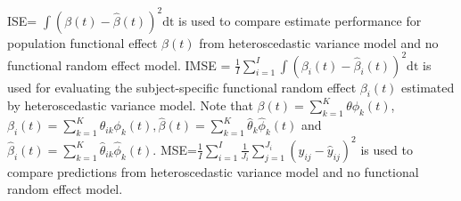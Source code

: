 ISE= $\int(\beta(t)-\hat{\beta}(t))^2 \mbox{dt}$ is used to compare estimate performance for population functional effect $\beta(t)$ from heteroscedastic variance model and no functional random effect model. IMSE = $\frac{1}{I} \sum_{i=1}^{I} \int(\beta_i(t)-\hat{\beta}_i(t))^2 \mbox{dt}$ is used for evaluating the subject-specific functional random effect $\beta_i(t)$ estimated by heteroscedastic variance model. Note that ${\beta}(t) = \sum_{k=1}^{K} {\theta}{\phi}_k(t)$, ${\beta}_i(t) = \sum_{k=1}^{K} {\theta}_{ik}{\phi}_k(t), \hat{\beta}(t) = \sum_{k=1}^{K} \hat{\theta}_k\hat{\phi}_k(t)$
and $\hat{\beta}_i(t) = \sum_{k=1}^{K} \hat{\theta}_{ik}\hat{\phi}_k(t)$. MSE=$\frac{1}{I} \sum_{i=1}^{I}\frac{1}{J_i} \sum_{j=1}^{J_i}(y_{ij}-\hat{y}_{ij})^2$ is used to compare predictions from heteroscedastic variance model and no functional random effect model.


